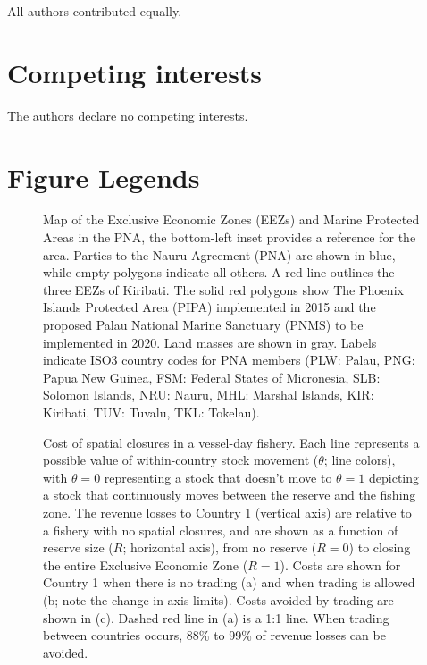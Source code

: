 \documentclass[12pt]{article}
\begin{document}
All authors contributed equally.

\section{Competing interests}

The authors declare no competing interests.

\FloatBarrier

\section{Figure Legends}

\begin{figure}[htbp]
\centering
\caption{\label{fig:PNA_map}Map of the Exclusive Economic Zones (EEZs) and Marine Protected Areas in the PNA, the bottom-left inset provides a reference for the area. Parties to the Nauru Agreement (PNA) are shown in blue, while empty polygons indicate all others. A red line outlines the three EEZs of Kiribati. The solid red polygons show The Phoenix Islands Protected Area (PIPA) implemented in 2015 and the proposed Palau National Marine Sanctuary (PNMS) to be implemented in 2020. Land masses are shown in gray. Labels indicate ISO3 country codes for PNA members (PLW: Palau, PNG: Papua New Guinea, FSM: Federal States of Micronesia, SLB: Solomon Islands, NRU: Nauru, MHL: Marshal Islands, KIR: Kiribati, TUV: Tuvalu, TKL: Tokelau).}
\end{figure}

\begin{figure}[htbp]
\centering
\caption{\label{fig:PNA_model}Cost of spatial closures in a vessel-day fishery. Each line represents a possible value of within-country stock movement ($\theta$; line colors), with $\theta = 0$ representing a stock that doesn't move to $\theta = 1$ depicting a stock that continuously moves between the reserve and the fishing zone. The revenue losses to Country 1 (vertical axis) are relative to a fishery with no spatial closures, and are shown as a function of reserve size ($R$; horizontal axis), from no reserve ($R = 0$) to closing the entire Exclusive Economic Zone ($R = 1$). Costs are shown for Country 1 when there is no trading (a) and when trading is allowed (b; note the change in axis limits). Costs avoided by trading are shown in (c). Dashed red line in (a) is a 1:1 line. When trading between countries occurs, 88\% to 99\% of revenue losses can be avoided.}
\end{figure}
\end{document}
